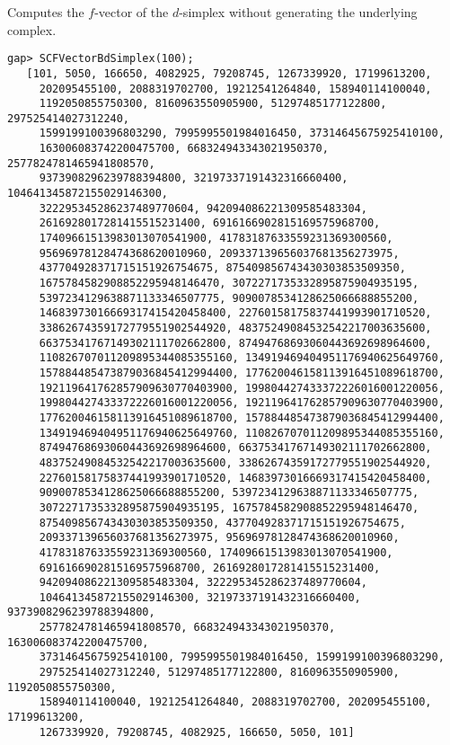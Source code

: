 \documentclass[a4paper,11pt]{report}
\begin{document}
{{{ Computes the $f$-vector of the $d$-simplex without generating the underlying complex. 
\begin{Verbatim}[commandchars=!@|,fontsize=\small,frame=single,label=Example]
   gap> SCFVectorBdSimplex(100);
   [101, 5050, 166650, 4082925, 79208745, 1267339920, 17199613200,
     202095455100, 2088319702700, 19212541264840, 158940114100040,
     1192050855750300, 8160963550905900, 51297485177122800, 297525414027312240,
     1599199100396803290, 7995995501984016450, 37314645675925410100,
     163006083742200475700, 668324943343021950370, 2577824781465941808570,
     9373908296239788394800, 32197337191432316660400, 104641345872155029146300,
     322295345286237489770604, 942094086221309585483304,
     2616928017281415515231400, 6916166902815169575968700,
     17409661513983013070541900, 41783187633559231369300560,
     95696978128474368620010960, 209337139656037681356273975,
     437704928371715151926754675, 875409856743430303853509350,
     1675784582908852295948146470, 3072271735332895875904935195,
     5397234129638871133346507775, 9090078534128625066688855200,
     14683973016669317415420458400, 22760158175837441993901710520,
     33862674359172779551902544920, 48375249084532542217003635600,
     66375341767149302111702662800, 87494768693060443692698964600,
     110826707011209895344085355160, 134919469404951176940625649760,
     157884485473879036845412994400, 177620046158113916451089618700,
     192119641762857909630770403900, 199804427433372226016001220056,
     199804427433372226016001220056, 192119641762857909630770403900,
     177620046158113916451089618700, 157884485473879036845412994400,
     134919469404951176940625649760, 110826707011209895344085355160,
     87494768693060443692698964600, 66375341767149302111702662800,
     48375249084532542217003635600, 33862674359172779551902544920,
     22760158175837441993901710520, 14683973016669317415420458400,
     9090078534128625066688855200, 5397234129638871133346507775,
     3072271735332895875904935195, 1675784582908852295948146470,
     875409856743430303853509350, 437704928371715151926754675,
     209337139656037681356273975, 95696978128474368620010960,
     41783187633559231369300560, 17409661513983013070541900,
     6916166902815169575968700, 2616928017281415515231400,
     942094086221309585483304, 322295345286237489770604,
     104641345872155029146300, 32197337191432316660400, 9373908296239788394800,
     2577824781465941808570, 668324943343021950370, 163006083742200475700,
     37314645675925410100, 7995995501984016450, 1599199100396803290,
     297525414027312240, 51297485177122800, 8160963550905900, 1192050855750300,
     158940114100040, 19212541264840, 2088319702700, 202095455100, 17199613200,
     1267339920, 79208745, 4082925, 166650, 5050, 101]
   

\end{Verbatim}}}}
\end{document}
